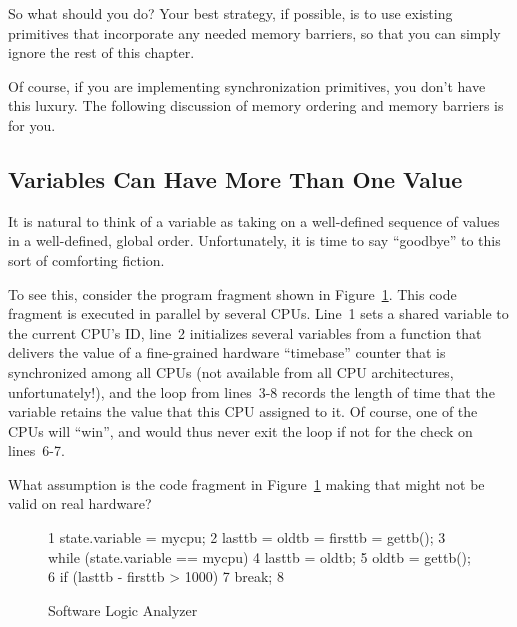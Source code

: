 So what should you do?
Your best strategy, if possible, is to use existing primitives that
incorporate any needed memory barriers, so that you can simply ignore
the rest of this chapter.

Of course, if you are implementing synchronization primitives,
you don't have this luxury.
The following discussion of memory ordering and memory barriers
is for you.

\subsection{Variables Can Have More Than One Value}
\label{sec:advsync:Variables Can Have More Than One Value}

It is natural to think of a variable as taking on a well-defined
sequence of values in a well-defined, global order.
Unfortunately, it is time to say ``goodbye'' to this sort of comforting
fiction.

To see this, consider the program fragment shown in
Figure~\ref{fig:advsync:Software Logic Analyzer}.
This code fragment is executed in parallel by several CPUs.
Line~1 sets a shared variable to the current CPU's ID, line~2
initializes several variables from a  function that
delivers the value of a fine-grained hardware ``timebase'' counter that is
synchronized among all CPUs (not available from all CPU architectures,
unfortunately!), and the loop from lines~3-8 records the length of
time that the variable retains the value that this CPU assigned to it.
Of course, one of the CPUs will ``win'', and would thus never exit
the loop if not for the check on lines~6-7.

\QuickQuiz{}
	What assumption is the code fragment
	in Figure~\ref{fig:advsync:Software Logic Analyzer}
	making that might not be valid on real hardware?
 \QuickQuizEnd

\begin{figure}[htbp]
{ \scriptsize
\begin{verbbox}
  1 state.variable = mycpu;
  2 lasttb = oldtb = firsttb = gettb();
  3 while (state.variable == mycpu) {
  4   lasttb = oldtb;
  5   oldtb = gettb();
  6   if (lasttb - firsttb > 1000)
  7     break;
  8 }
\end{verbbox}
}
\centering
\theverbbox
\caption{Software Logic Analyzer}
\label{fig:advsync:Software Logic Analyzer}
\end{figure}

